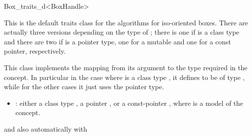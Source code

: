 
\begin{ccRefClass}{Box_traits_d<BoxHandle>}

\ccDefinition

This is the default traits class for the  algorithms for
iso-oriented boxes. There are actually three versions depending on the
type of ; there is one if  is a class type and there are
two if  is a pointer type, one for a mutable and one for a const
pointer, respectively.

This class implements the mapping from its  argument to
the  type required in the
 concept. In particular in the case where
 is a class type , it defines
 to be of type , while for the other
cases it just uses the pointer type.

\begin{itemize}
  \item
    : either a class type , a pointer , or a
    const-pointer , where  is a model of the
     concept.
\end{itemize}

and also automatically with\\

\ccIsModel


\ccCreation
{}


\ccSeeAlso

\\
\\

\\

\end{ccRefClass}
